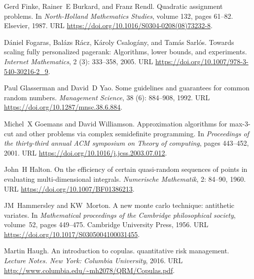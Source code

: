 \begin{thebibliography}{76}
Gerd Finke, Rainer~E Burkard, and Franz Rendl.
\newblock Quadratic assignment problems.
\newblock In \emph{North-Holland Mathematics Studies}, volume 132, pages 61--82. Elsevier, 1987.
\newblock URL \url{https://doi.org/10.1016/S0304-0208(08)73232-8}.

D{\'a}niel Fogaras, Bal{\'a}zs R{\'a}cz, K{\'a}roly Csalog{\'a}ny, and Tam{\'a}s Sarl{\'o}s.
\newblock Towards scaling fully personalized pagerank: Algorithms, lower bounds, and experiments.
\newblock \emph{Internet Mathematics}, 2 (3): 333--358, 2005.
\newblock URL \url{https://doi.org/10.1007/978-3-540-30216-2_9}.

Paul Glasserman and David~D Yao.
\newblock Some guidelines and guarantees for common random numbers.
\newblock \emph{Management Science}, 38 (6): 884--908, 1992.
\newblock URL \url{https://doi.org/10.1287/mnsc.38.6.884}.

Michel~X Goemans and David Williamson.
\newblock Approximation algorithms for max-3-cut and other problems via complex semidefinite programming.
\newblock In \emph{Proceedings of the thirty-third annual ACM symposium on Theory of computing}, pages 443--452, 2001.
\newblock URL \url{https://doi.org/10.1016/j.jcss.2003.07.012}.

John~H Halton.
\newblock On the efficiency of certain quasi-random sequences of points in evaluating multi-dimensional integrals.
\newblock \emph{Numerische Mathematik}, 2: 84--90, 1960.
\newblock URL \url{https://doi.org/10.1007/BF01386213}.

JM~Hammersley and KW~Morton.
\newblock A new monte carlo technique: antithetic variates.
\newblock In \emph{Mathematical proceedings of the Cambridge philosophical society}, volume~52, pages 449--475. Cambridge University Press, 1956.
\newblock URL \url{https://doi.org/10.1017/S0305004100031455}.

Martin Haugh.
\newblock An introduction to copulas. quantitative risk management.
\newblock \emph{Lecture Notes. New York: Columbia University}, 2016.
\newblock URL \url{http://www.columbia.edu/~mh2078/QRM/Copulas.pdf}.


\end{thebibliography}

